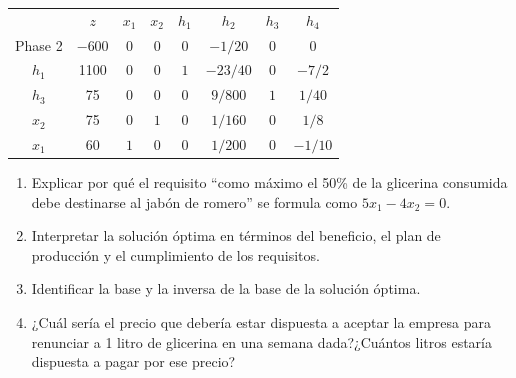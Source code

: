 \begin{center}
\begin{tabular}{c|c|cccccc|}
 & $z$ & $x_1$ & $x_2$ & $h_1$ & $h_2$ & $h_3$ & $h_4$\\ 
Phase 2 & $-600$ & $0$ & $0$ & $0$ & $-1/20$ & $0$ & $0$ \\ 
\hline
$h_1$ & 1100  & $0$ & $0$ & $1$ & $-23/40$ & $0$ & $-7/2$\\ 
$h_3$ & 75  & $0$ & $0$ & $0$ & $9/800$ & $1$ & $1/40$\\ 
$x_2$ & 75  & $0$ & $1$ & $0$ & $1/160$ & $0$ & $1/8$\\ 
$x_1$ & 60  & $1$ & $0$ & $0$ & $1/200$ & $0$ & $-1/10$\\ 
\hline
\end{tabular}
\end{center}




\begin{enumerate}[label=\alph*)]
    \item Explicar por qué el requisito ``como máximo el 50\% de la glicerina consumida debe destinarse al jabón de romero'' se formula como $5x_1 - 4x_2 = 0$.

    \item Interpretar la solución óptima en términos del beneficio, el plan de producción y el cumplimiento de los requisitos.
    
    \item Identificar la base y la inversa de la base de la solución óptima.

    \item ¿Cuál sería el precio que debería estar dispuesta a aceptar la empresa para renunciar a 1 litro de glicerina en una semana dada?¿Cuántos litros estaría dispuesta a pagar por ese precio?
\end{enumerate}